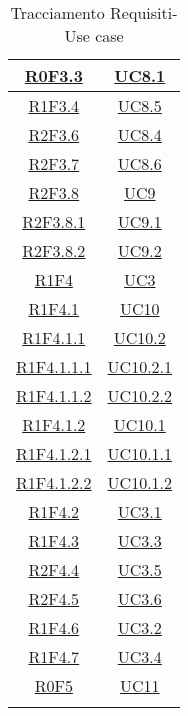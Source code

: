 \begin{longtable}{|c|c|}
\hline
\hyperlink{R0F3.3}{R0F3.3} & \hyperlink{UC8.1}{UC8.1}\\
\hline
\hyperlink{R1F3.4}{R1F3.4} & \hyperlink{UC8.5}{UC8.5}\\
\hline
\hyperlink{R2F3.6}{R2F3.6} & \hyperlink{UC8.4}{UC8.4}\\
\hline
\hyperlink{R2F3.7}{R2F3.7} & \hyperlink{UC8.6}{UC8.6}\\
\hline
\hyperlink{R2F3.8}{R2F3.8} & \hyperlink{UC9}{UC9}\\
\hline
\hyperlink{R2F3.8.1}{R2F3.8.1} & \hyperlink{UC9.1}{UC9.1}\\
\hline
\hyperlink{R2F3.8.2}{R2F3.8.2} & \hyperlink{UC9.2}{UC9.2}\\
\hline
\hyperlink{R1F4}{R1F4} & \hyperlink{UC3}{UC3}\\
\hline
\hyperlink{R1F4.1}{R1F4.1} & \hyperlink{UC10}{UC10}\\
\hline
\hyperlink{R1F4.1.1}{R1F4.1.1} & \hyperlink{UC10.2}{UC10.2}\\
\hline
\hyperlink{R1F4.1.1.1}{R1F4.1.1.1} & \hyperlink{UC10.2.1}{UC10.2.1}\\
\hline
\hyperlink{R1F4.1.1.2}{R1F4.1.1.2} & \hyperlink{UC10.2.2}{UC10.2.2}\\
\hline
\hyperlink{R1F4.1.2}{R1F4.1.2} & \hyperlink{UC10.1}{UC10.1}\\
\hline
\hyperlink{R1F4.1.2.1}{R1F4.1.2.1} & \hyperlink{UC10.1.1}{UC10.1.1}\\
\hline
\hyperlink{R1F4.1.2.2}{R1F4.1.2.2} & \hyperlink{UC10.1.2}{UC10.1.2}\\
\hline
\hyperlink{R1F4.2}{R1F4.2} & \hyperlink{UC3.1}{UC3.1}\\
\hline
\hyperlink{R1F4.3}{R1F4.3} & \hyperlink{UC3.3}{UC3.3}\\
\hline
\hyperlink{R2F4.4}{R2F4.4} & \hyperlink{UC3.5}{UC3.5}\\
\hline
\hyperlink{R2F4.5}{R2F4.5} & \hyperlink{UC3.6}{UC3.6}\\
\hline
\hyperlink{R1F4.6}{R1F4.6} & \hyperlink{UC3.2}{UC3.2}\\
\hline
\hyperlink{R1F4.7}{R1F4.7} & \hyperlink{UC3.4}{UC3.4}\\
\hline
\hyperlink{R0F5}{R0F5} & \hyperlink{UC11}{UC11}\\
\hline
\caption[Tracciamento Requisiti-Use case]{Tracciamento Requisiti-Use case}
\label{tabella:requi-usecase}
\end{longtable}
\clearpage


